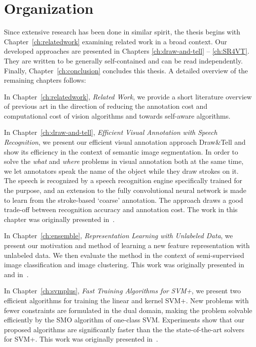 \section{Organization} 
Since extensive research has been done in similar spirit,  the thesis begins with Chapter~\ref{ch:relatedwork} examining related work in a broad context.   Our developed approaches are presented in Chapters \ref{ch:draw-and-tell} -- \ref{ch:SR4VT}. They are written to be generally self-contained and can be read independently. Finally,  Chapter~\ref{ch:conclusion} concludes this thesis. A detailed overview of the remaining chapters follows:

In Chapter~\ref{ch:relatedwork}, \emph{Related Work}, we provide a short literature overview of previous art in the direction of  reducing the annotation cost and computational cost of vision algorithms and towards self-aware  algorithms. 

In Chapter~\ref{ch:draw-and-tell}, \emph{Efficient Visual Annotation with Speech Recognition}, we present our efficient visual annotation approach Draw\&Tell and show its efficiency in the context of semantic image segmentation. In order to solve the \emph{what} and \emph{where} problems in visual annotation both at the same time, we let annotators speak the name of the object  while they draw strokes on it.  The speech is recognized by a speech recognition engine specifically trained for the purpose, and an extension to the fully convolutional neural network is made to learn from the stroke-based `coarse' annotation.  The approach draws a good trade-off between recognition accuracy and annotation cost. The work in this chapter was originally presented in~\citep{draw:tell}. 

In Chapter~\ref{ch:ensemble}, \emph{Representation Learning with Unlabeled Data}, we present our motivation and method of learning a new feature representation with unlabeled data.  We then evaluate the method in the context of semi-supervised image classification and image clustering.   This work was originally presented in~\citep{dai:eccv12} and in~\citep{dai:iccv13b}. 

In Chapter~\ref{ch:svmplus}, \emph{Fast Training Algorithms for SVM+}, we present two efficient algorithms
  for training the linear and kernel SVM+.  New problems with fewer constraints are formulated in the dual domain, making the problem solvable  efficiently by the SMO algorithm of one-class SVM.  Experiments show that our proposed algorithms are significantly faster than the  the state-of-the-art solvers for SVM+. This work was originally presented in~\citep{fastsvm+2016}. 
 
